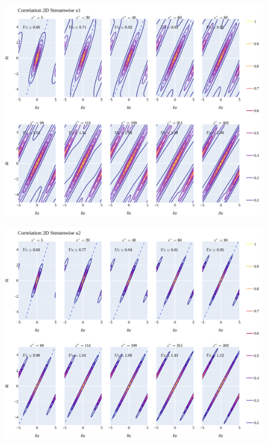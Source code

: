 \documentclass[]{article}
\theoremstyle{plain}
\theoremstyle{remark}
\begin{document}
\begin{figure}[H]
	\begin{center}
		\includegraphics[width=\textwidth]{../../output/figures/channel_wrles_retau395/split_time/frozen_turbulence/correlation2D/u1_all.png}
		
	\end{center}
\end{figure}

\begin{figure}[H]
	\begin{center}
		\includegraphics[width=\textwidth]{../../output/figures/channel_wrles_retau395/split_time/frozen_turbulence/correlation2D/u2_all.png}
		
	\end{center}
\end{figure}
\end{document}
